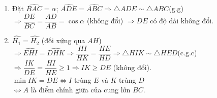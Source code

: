 \begin{bt}
{		\begin{enumerate}
			\item Đặt $\widehat{BAC}=\alpha$; $\widehat{ADE}=\widehat{ABC}\Rightarrow \triangle ADE\sim \triangle ABC$(g.g)\\
			$\Rightarrow \dfrac{DE}{BC}=\dfrac{AD}{AB}=\cos \alpha$ (không đổi) $\Rightarrow DE$ có độ dài không đổi.
			\item $\widehat{H_1}=\widehat{H_2}$ (đối xứng qua $AH$) $\Rightarrow \widehat{EHI}=\widehat{DHK}\Rightarrow \dfrac{HI}{HK}=\dfrac{HE}{HD}\Rightarrow \triangle HIK\sim \triangle HED$(c.g.c)\\
			$\Rightarrow \dfrac{IK}{DE}=\dfrac{HI}{HE}\geq 1\Rightarrow IK\geq DE$ (không đổi).\\
			$\min IK=DE\Leftrightarrow I$ trùng $E$ và $K$ trùng $D$\\
			$\Leftrightarrow A$ là điểm chính giữa của cung lớn $BC$.
		\end{enumerate}
	}
\end{bt}
